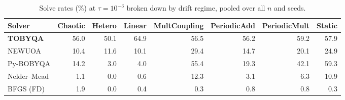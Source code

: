 \begin{table}[t]
\centering\footnotesize
\setlength{\tabcolsep}{3pt}
\caption{Solve rates (\%) at $\tau=10^{-3}$ broken down by drift regime, pooled over all $n$ and seeds.}
\label{tab:env-breakdown}
\begin{tabular}{lrrrrrrr}
\toprule
Solver & Chaotic & Hetero & Linear & MultCoupling & PeriodicAdd & PeriodicMult & Static \\
\midrule
\textbf{TOBYQA} & 56.0 & 50.1 & 64.9 & 56.5 & 56.2 & 59.2 & 57.9 \\
NEWUOA & 10.4 & 11.6 & 10.1 & 29.4 & 14.7 & 20.1 & 24.9 \\
Py-BOBYQA & 14.2 & 3.0 & 4.0 & 55.4 & 19.3 & 42.1 & 59.3 \\
Nelder--Mead & 1.1 & 0.0 & 0.6 & 12.3 & 3.1 & 6.3 & 10.9 \\
BFGS (FD) & 1.9 & 0.0 & 0.4 & 0.3 & 0.8 & 0.8 & 0.3 \\
\bottomrule
\end{tabular}
\end{table}